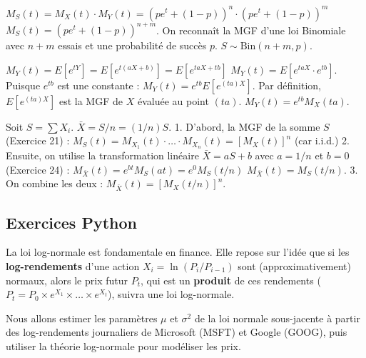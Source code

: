 \begin{correctionbox}
$M_S(t) = M_X(t) \cdot M_Y(t) = (p e^t + (1-p))^n \cdot (p e^t + (1-p))^m$
$M_S(t) = (p e^t + (1-p))^{n+m}$.
On reconnaît la MGF d'une loi Binomiale avec $n+m$ essais et une probabilité de succès $p$.
$S \sim \text{Bin}(n+m, p)$.
\end{correctionbox}

\begin{correctionbox}
$M_Y(t) = E[e^{tY}] = E[e^{t(aX + b)}] = E[e^{taX + tb}]$
$M_Y(t) = E[e^{taX} \cdot e^{tb}]$.
Puisque $e^{tb}$ est une constante :
$M_Y(t) = e^{tb} E[e^{(ta)X}]$.
Par définition, $E[e^{(ta)X}]$ est la MGF de $X$ évaluée au point $(ta)$.
$M_Y(t) = e^{tb} M_X(ta)$.
\end{correctionbox}

\begin{correctionbox}
Soit $S = \sum X_i$. $\bar{X} = S / n = (1/n)S$.
1.  D'abord, la MGF de la somme $S$ (Exercice 21) :
    $M_S(t) = M_{X_1}(t) \cdot \dots \cdot M_{X_n}(t) = [M_X(t)]^n$ (car i.i.d.)
2.  Ensuite, on utilise la transformation linéaire $\bar{X} = aS + b$ avec $a=1/n$ et $b=0$ (Exercice 24) :
    $M_{\bar{X}}(t) = e^{b t} M_S(a t) = e^0 M_S(t/n)$
    $M_{\bar{X}}(t) = M_S(t/n)$.
3.  On combine les deux :
    $M_{\bar{X}}(t) = [M_X(t/n)]^n$.
\end{correctionbox}

\subsection{Exercices Python}

La loi log-normale est fondamentale en finance. Elle repose sur l'idée que si les \textbf{log-rendements} d'une action $X_i = \ln(P_i / P_{i-1})$ sont (approximativement) normaux, alors le prix futur $P_t$, qui est un \textbf{produit} de ces rendements ($P_t = P_0 \times e^{X_1} \times \dots \times e^{X_t}$), suivra une loi log-normale.

Nous allons estimer les paramètres $\mu$ et $\sigma^2$ de la loi normale sous-jacente à partir des log-rendements journaliers de Microsoft (MSFT) et Google (GOOG), puis utiliser la théorie log-normale pour modéliser les prix.

